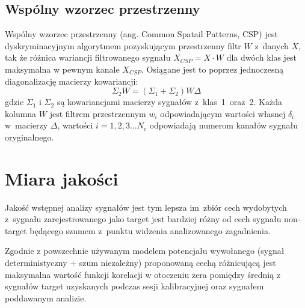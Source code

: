 \documentclass[licencjacka,openright]{pracamgr}
\begin{document}
\subsection{Wspólny wzorzec przestrzenny}
Wspólny wzorzec przestrzenny (ang. Common Spatail Patterns, CSP) \cite{koles1990} jest dyskryminacyjnym algorytmem pozyskującym przestrzenny filtr $W$ z~danych $X$, tak że różnica wariancji filtrowanego sygnału \mbox{$X_{CSP} = X \cdot W$} dla dwóch klas jest maksymalna w pewnym kanale $X_{CSP}$. Osiągane jest to poprzez jednoczesną diagonalizację macierzy kowariancji:
\begin{equation}
\Sigma _2 W = (\Sigma _1 + \Sigma _2 )W \Delta
\end{equation}
gdzie $\Sigma_1$ i $\Sigma_2$ są kowariancjami macierzy sygnałów z~klas~1~oraz~2. Każda kolumna $W$ jest filtrem przestrzennym $w_i$ odpowiadającym wartości własnej $\delta _i$ w~macierzy $\Delta$, wartości $i = 1,2,3 \ldots N_c$ odpowiadają numerom kanałów sygnału oryginalnego.%

\section{Miara jakości}
\label{miara}
Jakość wstępnej analizy sygnałów jest tym lepsza im~zbiór cech wydobytych z~sygnału zarejestrowanego jako target jest bardziej różny od cech sygnału non-target będącego szumem z~punktu widzenia analizowanego zagadnienia.

Zgodnie z powszechnie używanym modelem potencjału wywołanego (sygnał deterministyczny + szum niezależny) proponowaną cechą  różnicującą jest maksymalna wartość funkcji korelacji w otoczeniu zera pomiędzy średnią z sygnałów target uzyskanych podczas sesji kalibracyjnej oraz sygnałem poddawanym analizie.
\end{document}

